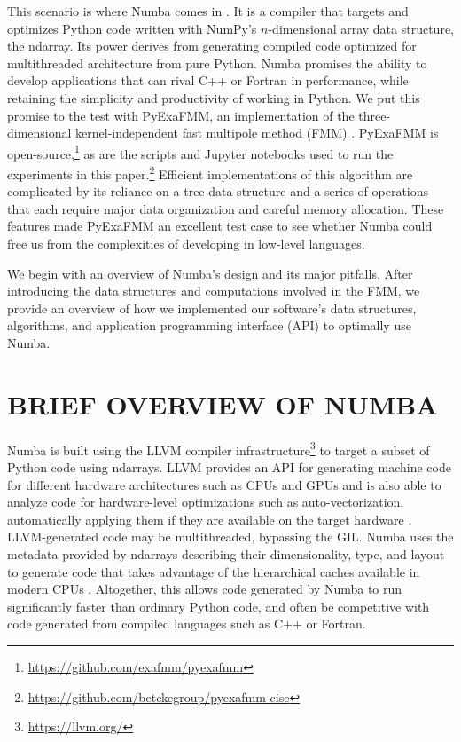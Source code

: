 \documentclass{IEEEcsmag}
\begin{document}
This scenario is where Numba comes in \cite{Lam2015}. It is a compiler that targets and optimizes Python code written with NumPy's $n$-dimensional array data structure, the ndarray. Its power derives from generating  compiled code optimized for multithreaded architecture from pure Python. Numba promises the ability to develop applications that can rival C++ or Fortran in performance, while retaining the simplicity and productivity of working in Python. We put this promise to the test with PyExaFMM, an implementation of the three-dimensional kernel-independent fast multipole method (FMM) \cite{Ying2004,Greengard1987}. PyExaFMM is open-source,\footnote{\url{https://github.com/exafmm/pyexafmm}} as are the scripts and Jupyter notebooks used to run the experiments in this paper.\footnote{\url{https://github.com/betckegroup/pyexafmm-cise}} Efficient implementations of this algorithm are complicated by its reliance on a tree data structure and a series of operations that each require major data organization and careful memory allocation. These features made PyExaFMM an excellent test case to see whether Numba could free us from the complexities of developing in low-level languages.

We begin with an overview of Numba's design and its major pitfalls. After introducing the data structures and computations involved in the FMM, we provide an overview of how we implemented our software's data structures, algorithms, and application programming interface (API) to optimally use Numba.

\section{BRIEF OVERVIEW OF NUMBA}

Numba is built using the LLVM compiler infrastructure\footnote{\url{https://llvm.org/}} to target a subset of Python code using ndarrays. LLVM provides an API for generating machine code for different hardware architectures such as CPUs and GPUs and is also able to analyze code for hardware-level optimizations such as auto-vectorization, automatically applying them if they are available on the target hardware \cite{Lattner2004}. LLVM-generated code may be multithreaded, bypassing the GIL.  Numba uses the metadata provided by ndarrays describing their dimensionality, type, and layout to generate code that takes advantage of the hierarchical caches available in modern CPUs \cite{Lam2015}. Altogether, this allows code generated by Numba to run significantly faster than ordinary Python code, and often be competitive with code generated from compiled languages such as C++ or Fortran. 
\end{document}
